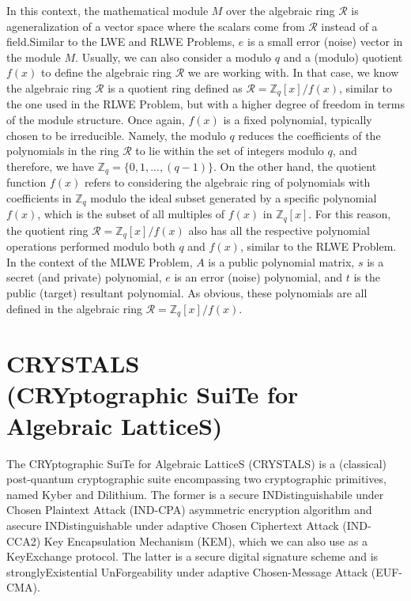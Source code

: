 \documentclass[runningheads]{llncs}
\numberwithin{equation}{section}
\begin{document}
    \noindent In this context, the mathematical module $M$ over the algebraic ring $\mathcal{R}$ is a\break generalization of a vector space where the scalars come from $\mathcal{R}$ instead of a field.\break\clearpage\noindent Similar to the LWE and RLWE Problems, $e$ is a small error (noise) vector in the module $M$. Usually, we can also consider a modulo $q$ and a (modulo) quotient $f(x)$ to define the algebraic ring $\mathcal{R}$ we are working with. In that case, we know the algebraic ring $\mathcal{R}$ is a quotient ring defined as $\mathcal{R} = {\mathbb{Z}}_{q}[x]/f(x)$, similar to the one used in the RLWE Problem, but with a higher degree of freedom in terms of the module structure. Once again, $f(x)$ is a fixed polynomial, typically chosen to be irreducible. Namely, the modulo $q$ reduces the coefficients of the polynomials in the ring $\mathcal{R}$ to lie within the set of integers modulo $q$, and therefore, we have ${\mathbb{Z}}_{q} = \{0, 1, ..., (q - 1)\}$. On the other hand, the quotient function $f(x)$ refers to considering the algebraic ring of polynomials with coefficients in ${\mathbb{Z}}_{q}$ modulo the ideal subset generated by a specific polynomial $f(x)$, which is the subset of all multiples of $f(x)$ in ${\mathbb{Z}}_{q}[x]$. For this reason, the quotient ring $\mathcal{R} = {\mathbb{Z}}_{q}[x]/f(x)$ also has all the respective polynomial operations performed modulo both $q$ and $f(x)$, similar to the RLWE Problem. In the context of the MLWE Problem, $A$ is a public polynomial matrix, $s$ is a secret (and private) polynomial, $e$ is an error (noise) polynomial, and $t$ is the public (target) resultant polynomial. As obvious, these polynomials are all defined in the algebraic ring $\mathcal{R} = {\mathbb{Z}}_{q}[x]/f(x)$.
    

    \vspace{-2ex}
    \section{CRYSTALS\\(CRYptographic SuiTe for Algebraic LatticeS)}
    \label{sec:crystals-cryptographic-suite-for-algebraic-lattices}

    The CRYptographic SuiTe for Algebraic LatticeS (CRYSTALS) is a (classical) post-quantum cryptographic suite encompassing two cryptographic primitives, named Kyber and Dilithium. The former is a secure INDistinguishabile under Chosen Plaintext Attack (IND-CPA) asymmetric encryption algorithm and a\break secure INDistinguishable under adaptive Chosen Ciphertext Attack (IND-CCA2) Key Encapsulation Mechanism (KEM), which we can also use as a Key\break Exchange protocol. The latter is a secure digital signature scheme and is strongly\break Existential UnForgeability under adaptive Chosen-Message Attack (EUF-CMA).
    
\end{document}
